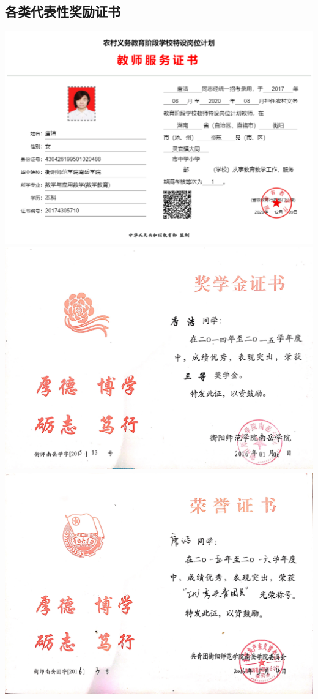 \documentclass[UFT8]{ctexart}%
\begin{document}
\subsection{各类代表性奖励证书}
\begin{center}
 \includegraphics[scale=0.2]{figs/特岗服务证书.JPG }
 \includegraphics[scale=0.1]{figs/20160106.JPG }
 \includegraphics[scale=0.1]{figs/20160504.JPG }

\end{center}
\end{document}
